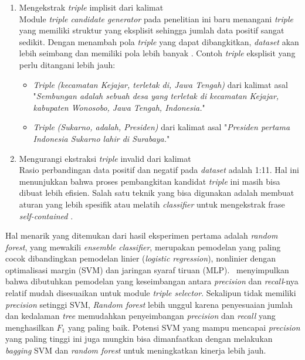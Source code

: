 \begin{enumerate}
	\item Mengekstrak \textit{triple} implisit dari kalimat \\
	Module \textit{triple candidate generator} pada penelitian ini baru menangani \textit{triple} yang memiliki struktur yang eksplisit sehingga jumlah data positif sangat sedikit. Dengan menambah pola \textit{triple} yang dapat dibangkitkan, \textit{dataset} akan lebih seimbang dan memiliki pola lebih banyak \citep{schmitz2012open}. Contoh \textit{triple} eksplisit yang perlu ditangani lebih jauh:
	\begin{itemize}
		\item \textit{Triple} \textit{(kecamatan Kejajar, terletak di, Jawa Tengah)} dari kalimat asal "\textit{Sembungan adalah sebuah desa yang terletak di kecamatan Kejajar, kabupaten Wonosobo, Jawa Tengah, Indonesia.}"		
		\item \textit{Triple} \textit{(Sukarno, adalah, Presiden)} dari kalimat asal "\textit{Presiden pertama Indonesia Sukarno lahir di Surabaya.}"
	\end{itemize} 
	
	\item Mengurangi ekstraksi \textit{triple} invalid dari kalimat \\
	Rasio perbandingan data positif dan negatif pada \textit{dataset} adalah 1:11. Hal ini menunjukkan bahwa proses pembangkitan kandidat \textit{triple} ini masih bisa dibuat lebih efisien. Salah satu teknik yang bisa digunakan adalah membuat aturan yang lebih spesifik atau melatih \textit{classifier} untuk mengekstrak frase \textit{self-contained} \citep{angeli2015leveraging}.
	
\end{enumerate}

Hal menarik yang ditemukan dari hasil eksperimen pertama adalah \textit{random forest}, yang mewakili \textit{ensemble classifier}, merupakan pemodelan yang paling cocok dibandingkan pemodelan linier (\textit{logistic regression}), nonlinier dengan optimalisasi margin (SVM) dan jaringan syaraf tiruan (MLP). \saya~menyimpulkan bahwa dibutuhkan pemodelan yang keseimbangan antara \textit{precision} dan \textit{recall}-nya relatif mudah disesuaikan untuk module \textit{triple selector}. Sekalipun tidak memiliki \textit{precision} setinggi SVM, \textit{Random forest} lebih unggul karena penyesuaian jumlah dan kedalaman \textit{tree} memudahkan penyeimbangan \textit{precision} dan \textit{recall} yang menghasilkan $F_1$ yang paling baik. Potensi SVM yang mampu mencapai \textit{precision} yang paling tinggi ini juga mungkin bisa dimanfaatkan dengan melakukan \textit{bagging} \citep{breiman1996bagging} SVM dan \textit{random forest} untuk meningkatkan kinerja lebih jauh.

